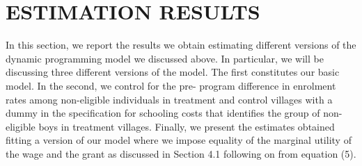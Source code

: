 \documentclass{handoutForSolutions}
\begin{document}
\newpage

\section{ESTIMATION RESULTS}
In this section, we report the results we obtain estimating different versions of the dynamic programming model we discussed above. In particular, we will be discussing three different versions of the model. The first constitutes our basic model. In the second, we control for the pre- program difference in enrolment rates among non-eligible individuals in treatment and control villages with a dummy in the specification for schooling costs that identifies the group of non-eligible boys in treatment villages. Finally, we present the estimates obtained fitting a version of our model where we impose equality of the marginal utility of the wage and the grant as discussed in Section 4.1 following on from equation (5).
\end{document}
